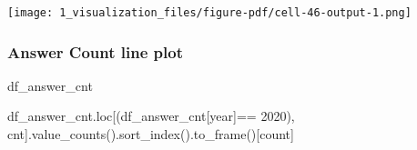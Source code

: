 \documentclass[
  letterpaper,
  DIV=11,
  numbers=noendperiod]{scrartcl}
\newenvironment{Shaded}{\begin{snugshade}}{\end{snugshade}}
\newcommand{\NormalTok}[1]{\textcolor[rgb]{0.00,0.23,0.31}{#1}}
\newcommand{\OperatorTok}[1]{\textcolor[rgb]{0.37,0.37,0.37}{#1}}
\newcommand{\StringTok}[1]{\textcolor[rgb]{0.13,0.47,0.30}{#1}}
\begin{document}
\texttt{[image: 1\_visualization\_files/figure-pdf/cell-46-output-1.png]}

\subsubsection{Answer Count line plot}\label{answer-count-line-plot}

\begin{Shaded}
\begin{Highlighting}[]
\NormalTok{df\_answer\_cnt}
\end{Highlighting}
\end{Shaded}

\begin{Shaded}
\begin{Highlighting}[]
\NormalTok{df\_answer\_cnt.loc[(df\_answer\_cnt[}\StringTok{\textquotesingle{}year\textquotesingle{}}\NormalTok{]}\OperatorTok{==} \StringTok{\textquotesingle{}2020\textquotesingle{}}\NormalTok{), }\StringTok{\textquotesingle{}cnt\textquotesingle{}}\NormalTok{].value\_counts().sort\_index().to\_frame()[}\StringTok{\textquotesingle{}count\textquotesingle{}}\NormalTok{]}
\end{Highlighting}
\end{Shaded}
\end{document}
